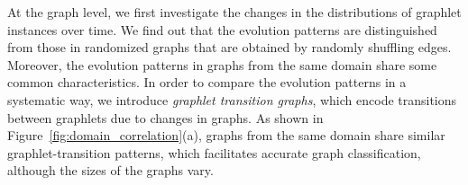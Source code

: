 
At the graph level, we first investigate the changes in the distributions of graphlet instances over time. We find out that the evolution patterns are distinguished from those in randomized graphs that are obtained by randomly shuffling edges. Moreover, the evolution patterns in graphs from the same domain share some common characteristics.
In order to compare the evolution patterns in a systematic way, we introduce \textit{graphlet transition graphs}, which encode transitions between graphlets due to changes in graphs.
As shown in Figure~\ref{fig:domain_correlation}(a), graphs from the same domain share similar graphlet-transition patterns, which facilitates accurate graph classification, although the sizes of the graphs vary.


